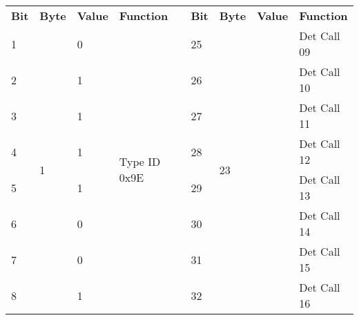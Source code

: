 \documentclass[]{article}
\begin{document}
\begin{landscape}
	\begin{table}[]
		\centering
		\begin{tabular}{lllllllll}
			\cline{1-4} \cline{6-9}
			\textbf{Bit} & \textbf{Byte}                                                       & \textbf{Value} & \textbf{Function}               & \multirow{9}{*}{} & \textbf{Bit} & \textbf{Byte}       & \textbf{Value} & \textbf{Function} \\ \cline{1-4} \cline{6-9} 
			1            & \multirow{8}{*}{1}                                                  & 0              & \multirow{8}{*}{Type ID 0x9E}   &                   & 25           & \multirow{8}{*}{23} &                & Det Call 09       \\
			2            &                                                                     & 1              &                                 &                   & 26           &                     &                & Det Call 10       \\
			3            &                                                                     & 1              &                                 &                   & 27           &                     &                & Det Call 11       \\
			4            &                                                                     & 1              &                                 &                   & 28           &                     &                & Det Call 12       \\
			5            &                                                                     & 1              &                                 &                   & 29           &                     &                & Det Call 13       \\
			6            &                                                                     & 0              &                                 &                   & 30           &                     &                & Det Call 14       \\
			7            &                                                                     & 0              &                                 &                   & 31           &                     &                & Det Call 15       \\
			8            &                                                                     & 1              &                                 &                   & 32           &                     &                & Det Call 16       \\ \cline{1-4} \cline{6-9} 

\end{tabular}
\end{table}
\end{landscape}
\end{document}
